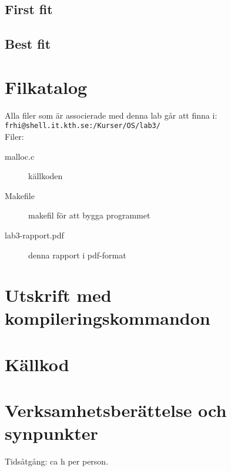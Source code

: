 \documentclass[a4paper]{article}
\begin{document}
\subsection*{First fit}

\subsection*{Best fit}

\section*{Filkatalog}
Alla filer som är associerade med denna lab går att finna i:\\
\texttt{frhi@shell.it.kth.se:/Kurser/OS/lab3/}
\\
Filer:
\begin{description}
\item[malloc.c] källkoden
\item[Makefile] makefil för att bygga programmet
\item[lab3-rapport.pdf] denna rapport i pdf-format
\end{description}

\section*{Utskrift med kompileringskommandon}
%

\section*{Källkod}
%

\section*{Verksamhetsberättelse och synpunkter}
Tidsåtgång: ca h per person.
\end{document}
